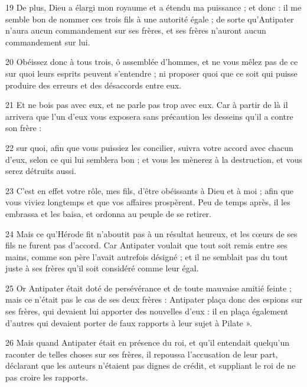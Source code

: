 \par 19 De plus, Dieu a élargi mon royaume et a étendu ma puissance ; et donc : il me semble bon de nommer ces trois fils à une autorité égale ; de sorte qu'Antipater n'aura aucun commandement sur ses frères, et ses frères n'auront aucun commandement sur lui.

\par 20 Obéissez donc à tous trois, ô assemblée d'hommes, et ne vous mêlez pas de ce sur quoi leurs esprits peuvent s'entendre ; ni proposer quoi que ce soit qui puisse produire des erreurs et des désaccords entre eux.

\par 21 Et ne bois pas avec eux, et ne parle pas trop avec eux. Car à partir de là il arrivera que l’un d’eux vous exposera sans précaution les desseins qu’il a contre son frère :

\par 22 sur quoi, afin que vous puissiez les concilier, suivra votre accord avec chacun d'eux, selon ce qui lui semblera bon ; et vous les mènerez à la destruction, et vous serez détruits aussi.

\par 23 C'est en effet votre rôle, mes fils, d'être obéissants à Dieu et à moi ; afin que vous viviez longtemps et que vos affaires prospèrent. Peu de temps après, il les embrassa et les baisa, et ordonna au peuple de se retirer.

\par 24 Mais ce qu'Hérode fit n'aboutit pas à un résultat heureux, et les cœurs de ses fils ne furent pas d'accord. Car Antipater voulait que tout soit remis entre ses mains, comme son père l'avait autrefois désigné ; et il ne semblait pas du tout juste à ses frères qu'il soit considéré comme leur égal.

\par 25 Or Antipater était doté de persévérance et de toute mauvaise amitié feinte ; mais ce n'était pas le cas de ses deux frères : Antipater plaça donc des espions sur ses frères, qui devaient lui apporter des nouvelles d'eux : il en plaça également d'autres qui devaient porter de faux rapports à leur sujet à Pilate ».

\par 26 Mais quand Antipater était en présence du roi, et qu'il entendait quelqu'un raconter de telles choses sur ses frères, il repoussa l'accusation de leur part, déclarant que les auteurs n'étaient pas dignes de crédit, et suppliant le roi de ne pas croire les rapports.

